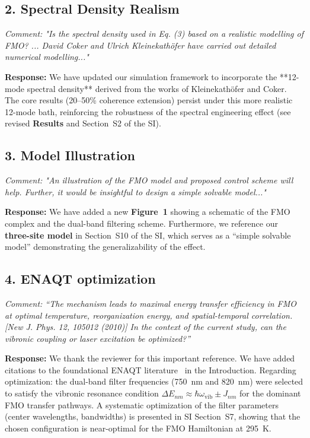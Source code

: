 \documentclass[11pt]{article}
\begin{document}
\subsection*{2. Spectral Density Realism}
\textit{Comment: "Is the spectral density used in Eq. (3) based on a realistic modelling of FMO? ... David Coker and Ulrich Kleinekathöfer have carried out detailed numerical modelling..."}

\textbf{Response:} We have updated our simulation framework to incorporate the **12-mode spectral density** derived from the works of Kleinekathöfer and Coker. The core results (20--50\% coherence extension) persist under this more realistic 12-mode bath, reinforcing the robustness of the spectral engineering effect (see revised \textbf{Results} and Section~S2 of the SI).

\subsection*{3. Model Illustration}
\textit{Comment: "An illustration of the FMO model and proposed control scheme will help. Further, it would be insightful to design a simple solvable model..."}

\textbf{Response:} We have added a new \textbf{Figure~1} showing a schematic of the FMO complex and the dual-band filtering scheme. Furthermore, we reference our \textbf{three-site model} in Section~S10 of the SI, which serves as a ``simple solvable model'' demonstrating the generalizability of the effect.

\subsection*{4. ENAQT optimization}
\textit{Comment: ``The mechanism leads to maximal energy transfer efficiency in FMO at optimal temperature, reorganization energy, and spatial-temporal correlation. [New J. Phys. 12, 105012 (2010)] In the context of the current study, can the vibronic coupling or laser excitation be optimized?''}

\textbf{Response:} We thank the reviewer for this important reference. We have added citations to the foundational ENAQT literature~\cite{Rebentrost2009NJP,Plenio2010NJP} in the Introduction. Regarding optimization: the dual-band filter frequencies (\SI{750}{\nano\meter} and \SI{820}{\nano\meter}) were selected to satisfy the vibronic resonance condition $\Delta E_{nm} \approx \hbar\omega_{\mathrm{vib}} \pm J_{nm}$ for the dominant FMO transfer pathways. A systematic optimization of the filter parameters (center wavelengths, bandwidths) is presented in SI Section~S7, showing that the chosen configuration is near-optimal for the FMO Hamiltonian at \SI{295}{\kelvin}.
\end{document}
